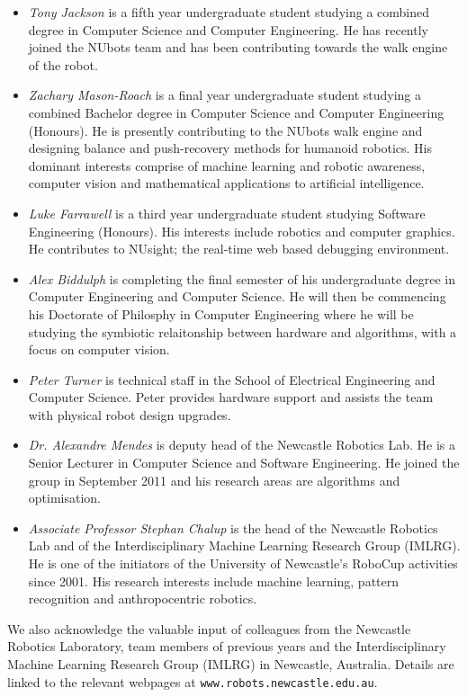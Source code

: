 \documentclass{llncs}
\begin{document}
\begin{itemize}
\item \emph{Tony Jackson} is a fifth year undergraduate student studying a combined degree in Computer Science and Computer Engineering. He has recently joined the NUbots team and has been contributing towards the walk engine of the robot.

\item \emph{Zachary Mason-Roach} is a final year undergraduate student studying a combined Bachelor degree in Computer Science and Computer Engineering (Honours). He is presently contributing to the NUbots walk engine and designing balance and push-recovery methods for humanoid robotics.  His dominant interests comprise of machine learning and robotic awareness, computer vision and mathematical applications to artificial intelligence.

\item \emph{Luke Farrawell} is a third year undergraduate student studying Software Engineering (Honours). His interests include robotics and computer graphics. He contributes to NUsight; the real-time web based debugging environment.


\item \emph{Alex Biddulph} is completing the final semester of his undergraduate degree in Computer Engineering and Computer Science. He will then be commencing his Doctorate of Philosphy in Computer Engineering where he will be studying the symbiotic relaitonship between hardware and algorithms, with a focus on computer vision.

\item \emph{Peter Turner} is technical staff in the School of Electrical Engineering and Computer Science. Peter provides hardware support and assists the team with physical robot design upgrades. %

\item \emph{Dr. Alexandre Mendes} is deputy head of the Newcastle Robotics Lab. He is a Senior Lecturer in Computer Science and Software Engineering. He joined the group in September 2011 and his research areas are algorithms and optimisation.

\item \emph{Associate Professor Stephan Chalup} is the head of the Newcastle Robotics Lab and of the Interdisciplinary Machine Learning Research Group (IMLRG). He is one of the initiators of the University of Newcastle's RoboCup activities since 2001. His research interests include machine learning, pattern recognition and anthropocentric robotics.

\end{itemize}
We also acknowledge the valuable input of colleagues from the Newcastle Robotics Laboratory, team members of previous years
and the Interdisciplinary Machine Learning Research Group (IMLRG) in
Newcastle, Australia. Details are linked to the relevant webpages at
\texttt{www.robots.newcastle.edu.au}.
\end{document}
